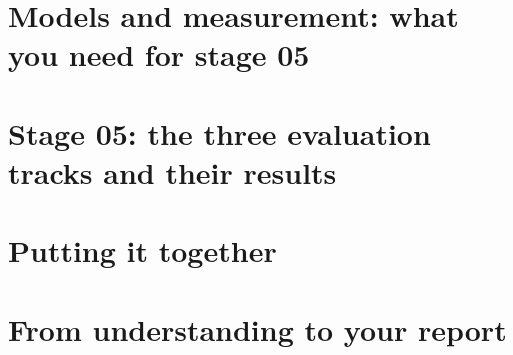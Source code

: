 \documentclass[11pt,a4paper,oneside]{report}
\begin{document}
\part{Models and measurement: what you need for stage 05}



\part{Stage 05: the three evaluation tracks and their results}




\part{Putting it together}


\part{From understanding to your report}





\appendix





\nocite{*}

\renewcommand{\bibname}{Reference list: every verified source you may cite}

\end{document}
